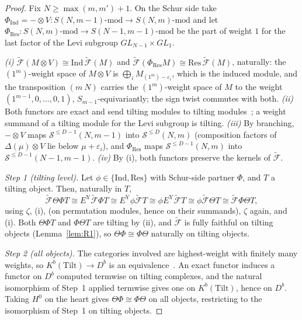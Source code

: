 \begin{proof}
Fix $N\ge\max(m,m')+1$.  On the Schur side take
$\Phi_{\mathrm{Ind}}=-\otimes V\colon S(N,m-1)\text{-mod}\to S(N,m)\text{-mod}$ and let
$\Phi_{\mathrm{Res}}\colon S(N,m)\text{-mod}\to S(N-1,m-1)\text{-mod}$ be the part of weight
$1$ for the last factor of the Levi subgroup $GL_{N-1}\times GL_1$.

\emph{(i)}  $\tilde{\mathcal F}(M\otimes V)\cong\mathrm{Ind}\,\tilde{\mathcal F}(M)$ and
$\tilde{\mathcal F}(\Phi_{\mathrm{Res}}M)\cong\mathrm{Res}\,\tilde{\mathcal F}(M)$, naturally:
the $(1^m)$-weight space of $M\otimes V$ is $\bigoplus_i M_{(1^m)-\varepsilon_i}$, which is
the induced module, and the transposition $(m\ N)$ carries the $(1^m)$-weight space of $M$ to
the weight $(1^{m-1},0,\dots,0,1)$, $S_{m-1}$-equivariantly; the sign twist commutes with both.
\emph{(ii)}  Both functors are exact and send tilting modules to tilting
modules~\cite{wang1982,donkin1998,mathieu1990}; a weight summand of a tilting module for the
Levi subgroup is tilting.
\emph{(iii)}  By branching, $-\otimes V$ maps $\mathcal S^{\le D-1}(N,m-1)$ into
$\mathcal S^{\le D}(N,m)$ (composition factors of $\Delta(\mu)\otimes V$ lie below
$\mu+\varepsilon_i$), and $\Phi_{\mathrm{Res}}$ maps $\mathcal S^{\le D-1}(N,m)$ into
$\mathcal S^{\le D-1}(N-1,m-1)$.
\emph{(iv)}  By (i), both functors preserve the kernels of $\tilde{\mathcal F}$.

\emph{Step 1 (tilting level).}  Let $\phi\in\{\mathrm{Ind},\mathrm{Res}\}$ with Schur-side
partner $\Phi$, and $T$ a tilting object.  Then, naturally in $T$,
\[
  \tilde{\mathcal F}\Theta\Phi T\cong E^{\mathrm Y}\tilde{\mathcal F}\Phi T
  \cong E^{\mathrm Y}\phi\tilde{\mathcal F}T\cong\phi E^{\mathrm Y}\tilde{\mathcal F}T
  \cong\phi\tilde{\mathcal F}\Theta T\cong\tilde{\mathcal F}\Phi\Theta T,
\]
using $\zeta$, (i), \cite[Prop.~2.7]{harman2015} (on permutation modules, hence on their
summands), $\zeta$ again, and (i).  Both $\Theta\Phi T$ and $\Phi\Theta T$ are tilting by
(ii), and $\tilde{\mathcal F}$ is fully faithful on tilting objects (Lemma~\ref{lem:R1}), so
$\Theta\Phi\cong\Phi\Theta$ naturally on tilting objects.

\emph{Step 2 (all objects).}  The categories involved are highest-weight with finitely many
weights, so $K^b(\mathrm{Tilt})\to D^b$ is an equivalence~\cite{ringel1991,happel1988}.  An
exact functor induces a functor on $D^b$ computed termwise on tilting complexes, and the natural
isomorphism of Step~1 applied termwise gives one on $K^b(\mathrm{Tilt})$, hence on $D^b$.
Taking $H^0$ on the heart gives $\Theta\Phi\cong\Phi\Theta$ on all objects, restricting to the
isomorphism of Step~1 on tilting objects.


\end{proof}
